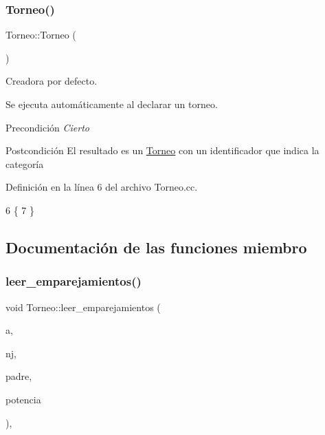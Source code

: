 \subsubsection{\texorpdfstring{Torneo()}{Torneo()}}
{\footnotesize\ttfamily Torneo\+::\+Torneo (\begin{DoxyParamCaption}{ }\end{DoxyParamCaption})}



Creadora por defecto. 

Se ejecuta automáticamente al declarar un torneo. \begin{DoxyPrecond}{Precondición}
{\itshape Cierto} 
\end{DoxyPrecond}
\begin{DoxyPostcond}{Postcondición}
El resultado es un \hyperlink{class_torneo}{Torneo} con un identificador que indica la categoría 
\end{DoxyPostcond}


Definición en la línea 6 del archivo Torneo.\+cc.


\begin{DoxyCode}
6               \{
7 \}
\end{DoxyCode}


\subsection{Documentación de las funciones miembro}
\mbox{\label{class_torneo_ae4d0e16d82621a4f5e16fcec74ccdcba}} 
\subsubsection{\texorpdfstring{leer\+\_\+emparejamientos()}{leer\_emparejamientos()}}
{\footnotesize\ttfamily void Torneo\+::leer\+\_\+emparejamientos (\begin{DoxyParamCaption}\item[{Bin\+Tree$<$ int $>$ \&}]{a,  }\item[{int}]{nj,  }\item[{int}]{padre,  }\item[{int}]{potencia }\end{DoxyParamCaption})\hspace{0.3cm}{\ttfamily [static]}, {\ttfamily [private]}}



